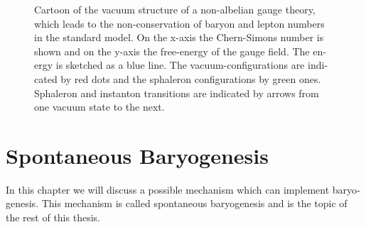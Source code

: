 \documentclass[master,       %
               twoside,        %
               BCOR10mm,       %
               english,ngerman, %
               ]{GAUBM}
\begin{document}
\begin{otherlanguage}{english}
\begin{figure}[H]
	\centering
	\caption{Cartoon of the vacuum structure of a non-albelian gauge theory, which leads to the non-conservation of baryon and lepton numbers in the standard model.
		On the x-axis the Chern-Simons number is shown and on the y-axis the free-energy of the gauge field.
		The energy is sketched as a blue line. The vacuum-configurations are indicated by red dots and the sphaleron configurations by green ones. Sphaleron and instanton transitions are indicated by arrows from one vacuum state
		to the next.
	}
	\label{fig:sphaleron_cartoon}
\end{figure}


\section{Spontaneous Baryogenesis}
\label{sec:spontaneous_baryogenesis}
\label{sec:sbg}

In this chapter we will discuss a possible mechanism which can implement baryogenesis. This mechanism is called spontaneous baryogenesis and is the topic of the rest of this thesis.


\end{otherlanguage}
\end{document}
